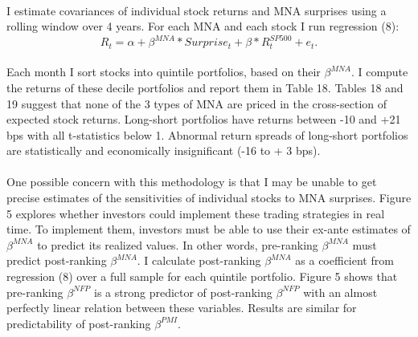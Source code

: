 \documentclass[12pt]{article}
\begin{document}
\paragraph{}
I estimate covariances of individual stock returns and MNA surprises using a rolling window over 4 years. For each MNA and each stock I run regression (8):
\begin{equation}
   R_t = \alpha + \beta^{MNA} * Surprise_t + \beta*R^{SP500}_t + e_t.
\end{equation}
\paragraph{}
Each month I sort stocks into quintile portfolios, based on their $\beta^{MNA}$. I compute the returns of these decile portfolios and report them in Table 18. Tables 18 and 19 suggest that none of the 3 types of MNA are priced in the cross-section of expected stock returns. Long-short portfolios have returns between -10 and +21 bps with all t-statistics below 1. Abnormal return spreads of long-short portfolios are statistically and economically insignificant (-16 to + 3 bps).
\paragraph{}
One possible concern with this methodology is that I may be unable to get precise estimates of the sensitivities of individual stocks to MNA surprises. Figure 5 explores whether investors could implement these trading strategies in real time. To implement them, investors must be able to use their ex-ante estimates of $\beta^{MNA}$ to predict its realized values. In other words, pre-ranking $\beta^{MNA}$ must predict post-ranking $\beta^{MNA}$. I calculate post-ranking $\beta^{MNA}$ as a coefficient from regression (8) over a full sample for each quintile portfolio. Figure 5 shows that pre-ranking $\beta^{NFP}$ is a strong predictor of post-ranking $\beta^{NFP}$ with an almost perfectly linear relation between these variables. Results are similar for predictability of post-ranking $\beta^{PMI}$.
\end{document}
